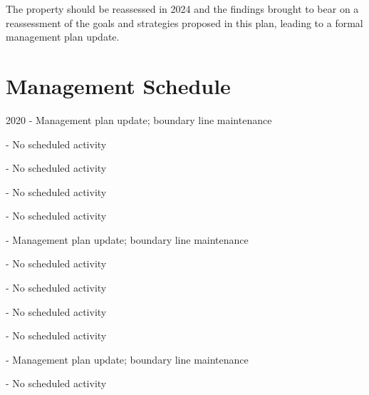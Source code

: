 \documentclass[]{tufte-handout}
\begin{document}
The property should be reassessed in 2024 and the findings brought to
bear on a reassessment of the goals and strategies proposed in this
plan, leading to a formal management plan update.

\newpage

\section{Management Schedule}\label{management-schedule}

\small 2020 - Management plan update; boundary line maintenance

\vspace{5pt}

 - No scheduled activity

\vspace{5pt}

 - No scheduled activity

\vspace{5pt}

 - No scheduled activity

\vspace{5pt}

 - No scheduled activity

\vspace{5pt}

 - Management plan update; boundary line maintenance

\vspace{5pt}

 - No scheduled activity

\vspace{5pt}

 - No scheduled activity

\vspace{5pt}

 - No scheduled activity

\vspace{5pt}

 - No scheduled activity

\vspace{5pt}

 - Management plan update; boundary line maintenance

\vspace{5pt}

 - No scheduled activity
\end{document}
